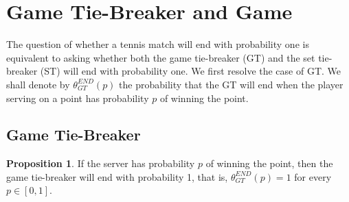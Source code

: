 \documentclass[11pt]{article}
\theoremstyle{plain}
\theoremstyle{definition}
\newtheorem{proposition}[theorem]{Proposition}
\begin{document}
\section{Game Tie-Breaker and Game}
\label{sec: Game}

The question of whether a tennis match will end with probability one is equivalent to asking whether both the game tie-breaker (GT) and the set tie-breaker (ST) will end with probability one. We first resolve the case of GT.   We shall denote by $\theta_{GT}^{END}(p)$ the probability that the GT will end when the player serving on a point has probability $p$ of winning the point. 

\subsection{Game Tie-Breaker}

\begin{proposition}
\label{prop: game tie-breaker ends}
    If the server has probability $p$ of winning the point, then the game tie-breaker will end with probability 1, that is, $\theta_{GT}^{END}(p) = 1$ for every $p \in [0,1].$
\end{proposition}
\end{document}
